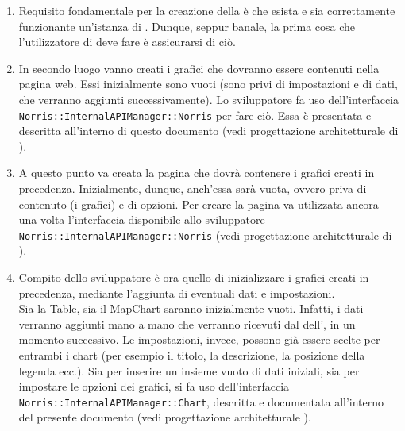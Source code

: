         \begin{enumerate}
            \item Requisito fondamentale per la creazione della  è che esista e sia correttamente funzionante un'istanza di . Dunque, seppur banale, la prima cosa che l'utilizzatore di  deve fare è assicurarsi di ciò.
            \item In secondo luogo vanno creati i grafici che dovranno essere contenuti nella pagina web. Essi inizialmente sono vuoti (sono privi di impostazioni e di dati, che verranno aggiunti successivamente). Lo sviluppatore fa uso dell'interfaccia \texttt{Norris::InternalAPIManager::Norris} per fare ciò. Essa è presentata e descritta all'interno di questo documento (vedi progettazione architetturale di ).
            \item A questo punto va creata la pagina che dovrà contenere i grafici creati in precedenza. Inizialmente, dunque, anch'essa sarà vuota, ovvero priva di contenuto (i grafici) e di opzioni. Per creare la pagina va utilizzata ancora una volta l'interfaccia disponibile allo sviluppatore \texttt{Norris::InternalAPIManager::Norris} (vedi progettazione architetturale di ).
            \item Compito dello sviluppatore è ora quello di inizializzare i grafici creati in precedenza, mediante l'aggiunta di eventuali dati e impostazioni.\\
            Sia la Table, sia il MapChart saranno inizialmente vuoti. Infatti, i dati verranno aggiunti mano a mano che verranno ricevuti dal  dell', in un momento successivo. Le impostazioni, invece, possono già essere scelte per entrambi i chart (per esempio il titolo, la descrizione, la posizione della legenda ecc.). Sia per inserire un insieme vuoto di dati iniziali, sia per impostare le opzioni dei grafici, si fa uso dell'interfaccia \texttt{Norris::InternalAPIManager::Chart}, descritta e documentata all'interno del presente documento (vedi progettazione architetturale ).

\end{enumerate}

